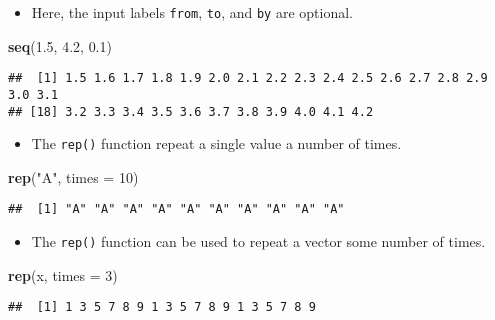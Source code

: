\documentclass[]{book}
\newenvironment{Shaded}{\begin{snugshade}}{\end{snugshade}}
\newcommand{\DataTypeTok}[1]{\textcolor[rgb]{0.13,0.29,0.53}{#1}}
\newcommand{\DecValTok}[1]{\textcolor[rgb]{0.00,0.00,0.81}{#1}}
\newcommand{\FloatTok}[1]{\textcolor[rgb]{0.00,0.00,0.81}{#1}}
\newcommand{\KeywordTok}[1]{\textcolor[rgb]{0.13,0.29,0.53}{\textbf{#1}}}
\newcommand{\NormalTok}[1]{#1}
\newcommand{\StringTok}[1]{\textcolor[rgb]{0.31,0.60,0.02}{#1}}
\providecommand{\tightlist}{%
  \setlength{\itemsep}{0pt}\setlength{\parskip}{0pt}}
\begin{document}
\begin{itemize}
\tightlist
\item
  Here, the input labels \texttt{from}, \texttt{to}, and \texttt{by} are optional.
\end{itemize}

\begin{Shaded}
\begin{Highlighting}[]
\KeywordTok{seq}\NormalTok{(}\FloatTok{1.5}\NormalTok{, }\FloatTok{4.2}\NormalTok{, }\FloatTok{0.1}\NormalTok{)}
\end{Highlighting}
\end{Shaded}

\begin{verbatim}
##  [1] 1.5 1.6 1.7 1.8 1.9 2.0 2.1 2.2 2.3 2.4 2.5 2.6 2.7 2.8 2.9 3.0 3.1
## [18] 3.2 3.3 3.4 3.5 3.6 3.7 3.8 3.9 4.0 4.1 4.2
\end{verbatim}

\begin{itemize}
\tightlist
\item
  The \texttt{rep()} function repeat a single value a number of times.
\end{itemize}

\begin{Shaded}
\begin{Highlighting}[]
\KeywordTok{rep}\NormalTok{(}\StringTok{"A"}\NormalTok{, }\DataTypeTok{times =} \DecValTok{10}\NormalTok{)}
\end{Highlighting}
\end{Shaded}

\begin{verbatim}
##  [1] "A" "A" "A" "A" "A" "A" "A" "A" "A" "A"
\end{verbatim}

\begin{itemize}
\tightlist
\item
  The \texttt{rep()} function can be used to repeat a vector some number of times.
\end{itemize}

\begin{Shaded}
\begin{Highlighting}[]
\KeywordTok{rep}\NormalTok{(x, }\DataTypeTok{times =} \DecValTok{3}\NormalTok{)}
\end{Highlighting}
\end{Shaded}

\begin{verbatim}
##  [1] 1 3 5 7 8 9 1 3 5 7 8 9 1 3 5 7 8 9
\end{verbatim}
\end{document}
